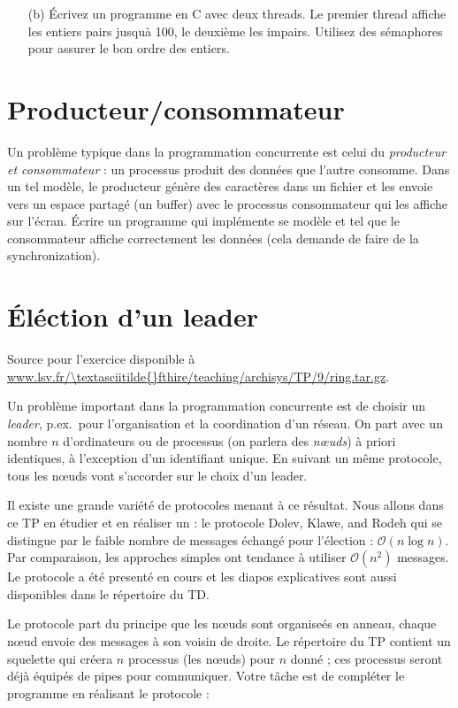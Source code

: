 \documentclass[11pt]{article}
\begin{document}
\begin{enumerate}
\item[(b)]
 Écrivez un programme en C avec deux threads. Le premier thread
 affiche les entiers pairs jusquà 100, le deuxième les impairs.
 Utilisez des sémaphores pour assurer le bon ordre des entiers.
\end{enumerate}

\section{Producteur/consommateur}

Un problème typique dans la programmation concurrente est celui du
\emph{producteur et consommateur} : un processus produit des données
que l'autre consomme. Dans un tel modèle, le producteur génère des caractères dans un
fichier et les envoie vers un espace partagé (un buffer) avec le processus consommateur
qui les affiche sur l'écran. Écrire un programme qui implémente se modèle et tel que le consommateur affiche correctement les données (cela demande de faire de la synchronization).

\section{Éléction d'un leader}

Source pour l'exercice disponible à \url{www.lsv.fr/\textasciitilde{}fthire/teaching/archisys/TP/9/ring.tar.gz}.

Un problème important dans la programmation concurrente est de choisir un
\emph{leader}, p.ex.\ pour l'organisation et la coordination d'un réseau. On
part avec un nombre $n$ d'ordinateurs ou de processus (on parlera des
\emph{nœuds}) à priori identiques, à l'exception d'un identifiant unique. En
suivant un même protocole, tous les nœuds vont s'accorder sur le choix d'un
leader.

Il existe une grande variété de protocoles menant à ce résultat.  Nous allons
dans ce TP en étudier et en réaliser un : le protocole Dolev, Klawe, and Rodeh
qui se distingue par le faible nombre de messages échangé pour l'élection :
$\mathcal{O}(n\log n)$. Par comparaison, les approches simples ont tendance à
utiliser $\mathcal{O}(n^2)$ messages.  Le protocole a été presenté en cours et
les diapos explicatives sont aussi disponibles dans le répertoire du TD.

Le protocole part du principe que les nœuds sont organiseés en anneau, chaque
nœud envoie des messages à son voisin de droite.  Le répertoire du TP contient
un squelette qui créera $n$ processus (les nœuds) pour $n$ donné ; ces processus
seront déjà équipés de pipes pour communiquer. Votre tâche est de compléter le
programme en réalisant le protocole :
\end{document}
